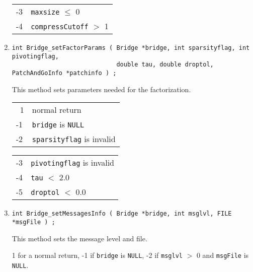 \begin{enumerate}
\begin{center}
\begin{tabular}{ll}
-3 & \texttt{maxsize} $\le$ 0 \\
-4 & \texttt{compressCutoff} $>$ 1
\end{tabular}
\end{center}
\item
\begin{verbatim}
int Bridge_setFactorParams ( Bridge *bridge, int sparsityflag, int pivotingflag, 
                             double tau, double droptol, PatchAndGoInfo *patchinfo ) ;
\end{verbatim}
This method sets parameters needed for the factorization.
\par {}
\begin{center}
\begin{tabular}{ll}
~1 & normal return \\
-1 & \texttt{bridge} is \texttt{NULL} \\
-2 & \texttt{sparsityflag} is invalid 
\end{tabular}
\begin{tabular}{ll}
-3 & \texttt{pivotingflag} is invalid  \\
-4 & \texttt{tau} $<$ 2.0 \\
-5 & \texttt{droptol} $<$ 0.0
\end{tabular}
\end{center}
\item
\begin{verbatim}
int Bridge_setMessagesInfo ( Bridge *bridge, int msglvl, FILE *msgFile ) ;
\end{verbatim}
This method sets the message level and file.
\par {}
1 for a  normal return,
-1 if \texttt{bridge} is \texttt{NULL},
-2 if \texttt{msglvl} $>$ 0 and \texttt{msgFile} is \texttt{NULL}.
\end{enumerate}
\par
